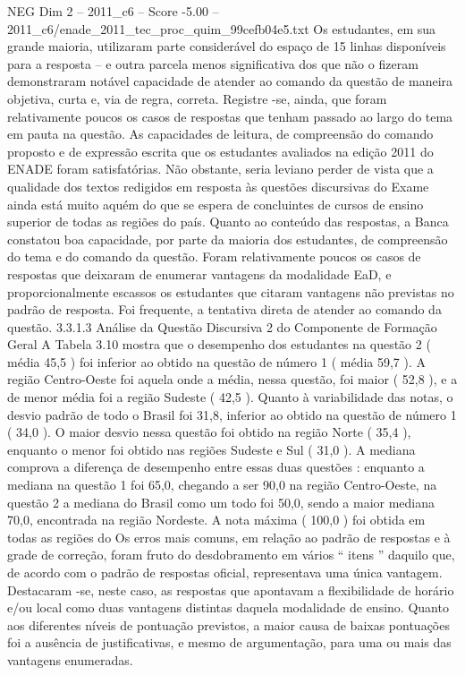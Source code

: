 \begin{textsample}{NEG Dim 2 – 2011\_c6 – Score -5.00 – 2011\_c6/enade\_2011\_tec\_proc\_quim\_99cefb04e5.txt}
Os estudantes, em sua grande maioria, utilizaram parte considerável do espaço de 15 linhas disponíveis para a resposta – e outra parcela menos significativa dos que não o fizeram demonstraram notável capacidade de atender ao comando da questão de maneira objetiva, curta e, via de regra, correta.
Registre -se, ainda, que foram relativamente poucos os casos de respostas que tenham passado ao largo do tema em pauta na questão.
As capacidades de leitura, de compreensão do comando proposto e de expressão escrita que os estudantes avaliados na edição 2011 do ENADE foram satisfatórias.
Não obstante, seria leviano perder de vista que a qualidade dos textos redigidos em resposta às questões discursivas do Exame ainda está muito aquém do que se espera de concluintes de cursos de ensino superior de todas as regiões do país.
Quanto ao conteúdo das respostas, a Banca constatou boa capacidade, por parte da maioria dos estudantes, de compreensão do tema e do comando da questão.
Foram relativamente poucos os casos de respostas que deixaram de enumerar vantagens da modalidade EaD, e proporcionalmente escassos os estudantes que citaram vantagens não previstas no padrão de resposta.
Foi frequente, a tentativa direta de atender ao comando da questão. 3.3.1.3 Análise da Questão Discursiva 2 do Componente de Formação Geral A Tabela 3.10 mostra que o desempenho dos estudantes na questão 2 ( média 45,5 ) foi inferior ao obtido na questão de número 1 ( média 59,7 ).
A região Centro-Oeste foi aquela onde a média, nessa questão, foi maior ( 52,8 ), e a de menor média foi a região Sudeste ( 42,5 ).
Quanto à variabilidade das notas, o desvio padrão de todo o Brasil foi 31,8, inferior ao obtido na questão de número 1 ( 34,0 ).
O maior desvio nessa questão foi obtido na região Norte ( 35,4 ), enquanto o menor foi obtido nas regiões Sudeste e Sul ( 31,0 ).
A mediana comprova a diferença de desempenho entre essas duas questões : enquanto a mediana na questão 1 foi 65,0, chegando a ser 90,0 na região Centro-Oeste, na questão 2 a mediana do Brasil como um todo foi 50,0, sendo a maior mediana 70,0, encontrada na região Nordeste.
A nota máxima ( 100,0 ) foi obtida em todas as regiões do Os erros mais comuns, em relação ao padrão de respostas e à grade de correção, foram fruto do desdobramento em vários “ itens ” daquilo que, de acordo com o padrão de respostas oficial, representava uma única vantagem.
Destacaram -se, neste caso, as respostas que apontavam a flexibilidade de horário e/ou local como duas vantagens distintas daquela modalidade de ensino.
Quanto aos diferentes níveis de pontuação previstos, a maior causa de baixas pontuações foi a ausência de justificativas, e mesmo de argumentação, para uma ou mais das vantagens enumeradas.

\end{textsample}
